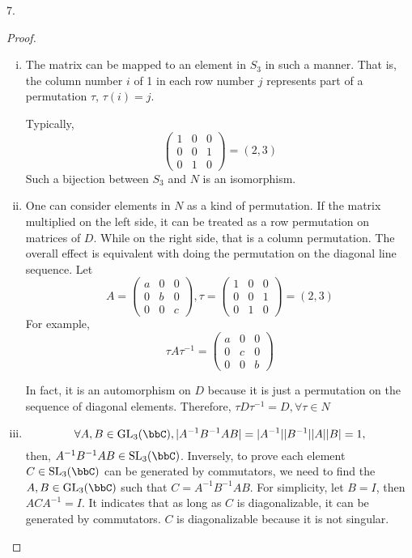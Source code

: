 \begin{exercise}
    7.
\end{exercise}

\begin{proof}
    \begin{enumerate}[(i)]
        \item The matrix can be mapped to an element in $S_3$ in such a manner. That is, the column number $i$ of 1 in each row number $j$ represents part of a permutation $\tau$, $\tau(i)=j$.
        
        Typically, 
        $$
        \left(\begin{array}{lll}{1} & {0} & {0} \\ {0} & {0} & {1} \\ {0} & {1} & {0}\end{array}\right) = (2,3)
        $$ 
        Such a bijection between $S_3$ and $N$ is an isomorphism.
        \item One can consider elements in $N$ as a kind of permutation. If the matrix multiplied on the left side, it can be treated as a row permutation on matrices of $D$. While on the right side, that is a column permutation. The overall effect is equivalent with doing the permutation on the diagonal line sequence.
        Let $$
        A = \left(\begin{array}{lll}
        {a} & {0} & {0} \\ 
        {0} & {b} & {0} \\ 
        {0} & {0} & {c}\end{array}\right) ,
        \tau = \left(\begin{array}{lll}
        {1} & {0} & {0} \\ 
        {0} & {0} & {1} \\ 
        {0} & {1} & {0}\end{array}\right) = (2,3)
        $$ 
        For example, $$\tau A \tau^{-1} = \left(\begin{array}{lll}
            {a} & {0} & {0} \\ 
            {0} & {c} & {0} \\ 
            {0} & {0} & {b}\end{array}\right) $$

        In fact, it is an automorphism on $D$ because it is just a permutation on the sequence of diagonal elements. Therefore, $\tau D \tau^{-1}= D, \forall \tau \in N$
        \item $$\forall A,B\in \mathrm{GL}_3(\bbC), |A^{-1}B^{-1}AB|=|A^{-1}||B^{-1}||A||B|=1,$$ then, $A^{-1}B^{-1}AB\in \mathrm{SL}_3(\bbC)$.
        Inversely, to prove each element $C\in \mathrm{SL}_3(\bbC)$ can be generated by commutators, we need to find the $A,B\in \mathrm{GL}_3(\bbC)$ such that $C=A^{-1}B^{-1}AB$. For simplicity, let $B=I$, then $ACA^{-1}=I$. It indicates that as long as $C$ is diagonalizable, it can be generated by commutators. $C$ is diagonalizable because it is not singular.
    \end{enumerate}
\end{proof}

